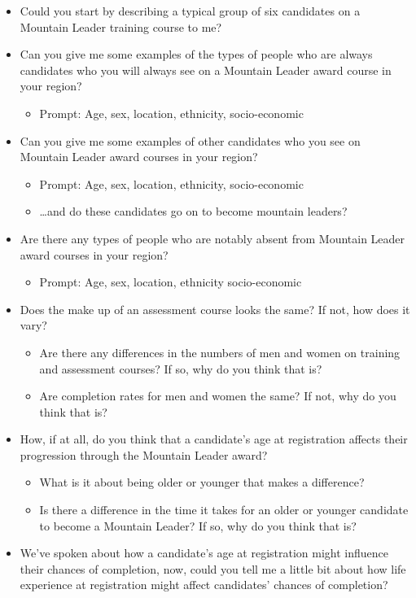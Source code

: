 \documentclass[
  12pt,
  a4paper,
]{book}
\providecommand{\tightlist}{%
  \setlength{\itemsep}{0pt}\setlength{\parskip}{0pt}}
\begin{document}
\begin{itemize}
\tightlist
\item
  Could you start by describing a typical group of six candidates on a Mountain Leader training course to me?
\item
  Can you give me some examples of the types of people who are always candidates who you will always see on a Mountain Leader award course in your region?

  \begin{itemize}
  \tightlist
  \item
    Prompt: Age, sex, location, ethnicity, socio-economic
  \end{itemize}
\item
  Can you give me some examples of other candidates who you see on Mountain Leader award courses in your region?

  \begin{itemize}
  \tightlist
  \item
    Prompt: Age, sex, location, ethnicity, socio-economic
  \item
    \ldots and do these candidates go on to become mountain leaders?
  \end{itemize}
\item
  Are there any types of people who are notably absent from Mountain Leader award courses in your region?

  \begin{itemize}
  \tightlist
  \item
    Prompt: Age, sex, location, ethnicity socio-economic
  \end{itemize}
\item
  Does the make up of an assessment course looks the same? If not, how does it vary?

  \begin{itemize}
  \tightlist
  \item
    Are there any differences in the numbers of men and women on training and assessment courses? If so, why do you think that is?
  \item
    Are completion rates for men and women the same? If not, why do you think that is?
  \end{itemize}
\item
  How, if at all, do you think that a candidate's age at registration affects their progression through the Mountain Leader award?

  \begin{itemize}
  \tightlist
  \item
    What is it about being older or younger that makes a difference?
  \item
    Is there a difference in the time it takes for an older or younger candidate to become a Mountain Leader? If so, why do you think that is?
  \end{itemize}
\item
  We've spoken about how a candidate's age at registration might influence their chances of completion, now, could you tell me a little bit about how life experience at registration might affect candidates' chances of completion?


\end{itemize}
\end{document}
